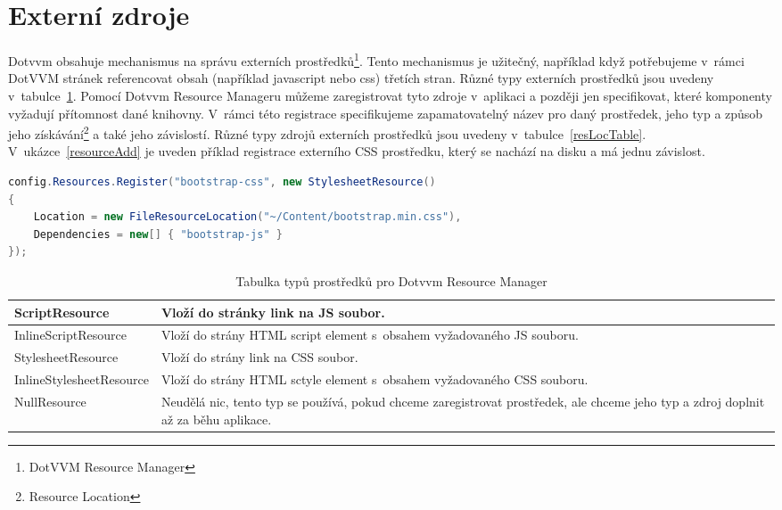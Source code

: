 \section{Externí zdroje}
Dotvvm obsahuje mechanismus na správu externích prostředků\footnote{DotVVM Resource Manager}. Tento mechanismus je užitečný, například když potřebujeme v~rámci DotVVM stránek referencovat obsah (například javascript nebo css) třetích stran. Různé typy externích prostředků jsou uvedeny v~tabulce~\ref{resTypeTable}. Pomocí Dotvvm Resource Manageru můžeme zaregistrovat tyto zdroje v~aplikaci a později jen specifikovat, které komponenty vyžadují přítomnost dané knihovny. V~rámci této registrace specifikujeme zapamatovatelný název pro daný prostředek, jeho typ a způsob jeho získávání\footnote{ Resource Location } a také jeho závislostí. Různé typy zdrojů externích prostředků jsou uvedeny v~tabulce~\ref{resLocTable}.  V~ukázce~\ref{resourceAdd} je uveden příklad registrace externího CSS prostředku, který se nachází na disku a má jednu závislost.
\pagebreak
\begin{lstlisting}[language=c#, caption=Registrace CSS,label=resourceAdd,captionpos=t]
config.Resources.Register("bootstrap-css", new StylesheetResource()
{
    Location = new FileResourceLocation("~/Content/bootstrap.min.css"),
    Dependencies = new[] { "bootstrap-js" }
});
\end{lstlisting}

\begin{table}[H]
	\caption{Tabulka typů prostředků pro Dotvvm Resource Manager}
	\label{resTypeTable}
	\centering
	\begin{tabular}{m{12em}|m{22em}}
		\toprule
ScriptResource           & Vloží do stránky link na JS soubor. \\ \midrule
InlineScriptResource     & Vloží do strány HTML script element s~obsahem vyžadovaného JS souboru. \\ \midrule
StylesheetResource       & Vloží do strány link na CSS soubor. \\ \midrule
InlineStylesheetResource & Vloží do strány HTML sctyle element s~obsahem vyžadovaného CSS souboru. \\ \midrule
NullResource             & Neudělá nic, tento typ se používá, pokud chceme zaregistrovat prostředek, ale chceme jeho typ a zdroj doplnit až za běhu aplikace. \\
\bottomrule
\end{tabular}
\end{table}

